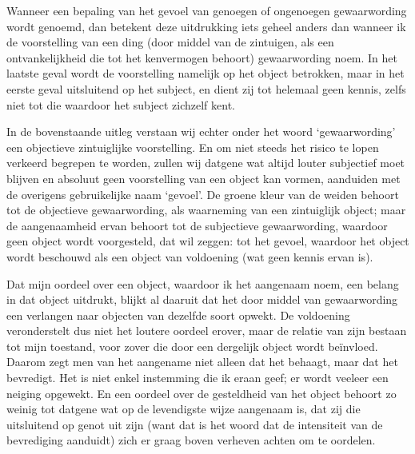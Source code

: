 Wanneer een bepaling van het gevoel van genoegen of ongenoegen gewaarwording wordt genoemd, dan betekent deze uitdrukking iets geheel anders dan wanneer ik de voorstelling van een ding (door middel van de zintuigen, als een ontvankelijkheid die tot het kenvermogen behoort) gewaarwording noem. In het laatste geval wordt de voorstelling namelijk op het object betrokken, maar in het eerste geval uitsluitend op het subject, en dient zij tot helemaal geen kennis, zelfs niet tot die waardoor het subject zichzelf kent.

In de bovenstaande uitleg verstaan wij echter onder het woord ‘gewaarwording’ een objectieve zintuiglijke voorstelling. En om niet steeds het risico te lopen verkeerd begrepen te worden, zullen wij datgene wat altijd louter subjectief moet blijven en absoluut geen voorstelling van een object kan vormen, aanduiden met de overigens gebruikelijke naam ‘gevoel’. De groene kleur van de weiden behoort tot de objectieve gewaarwording, als waarneming van een zintuiglijk object; maar de aangenaamheid ervan behoort tot de subjectieve gewaarwording, waardoor geen object wordt voorgesteld, dat wil zeggen: tot het gevoel, waardoor het object wordt beschouwd als een object van voldoening (wat geen kennis ervan is).

Dat mijn oordeel over een object, waardoor ik het aangenaam noem, een belang in dat object uitdrukt, blijkt al daaruit dat het door middel van gewaarwording een verlangen naar objecten van dezelfde soort opwekt. De voldoening veronderstelt dus niet het loutere oordeel erover, maar de relatie van zijn bestaan tot mijn toestand, voor zover die door een dergelijk object wordt beïnvloed. Daarom zegt men van het aangename niet alleen dat het behaagt, maar dat het bevredigt. Het is niet enkel instemming die ik eraan geef; er wordt veeleer een neiging opgewekt. En een oordeel over de gesteldheid van het object behoort zo weinig tot datgene wat op de levendigste wijze aangenaam is, dat zij die uitsluitend op genot uit zijn (want dat is het woord dat de intensiteit van de bevrediging aanduidt) zich er graag boven verheven achten om te oordelen.

